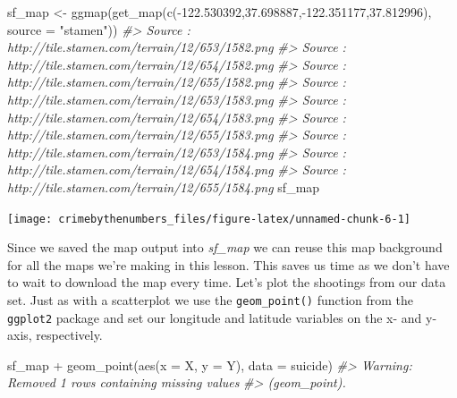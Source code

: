 \documentclass[
  12pt,
  openany]{book}
\newenvironment{Shaded}{\begin{snugshade}}{\end{snugshade}}
\newcommand{\AttributeTok}[1]{\textcolor[rgb]{0.61,0.61,0.61}{#1}}
\newcommand{\CommentTok}[1]{\textcolor[rgb]{0.37,0.37,0.37}{\textit{#1}}}
\newcommand{\FloatTok}[1]{\textcolor[rgb]{0.06,0.06,0.06}{#1}}
\newcommand{\FunctionTok}[1]{\textcolor[rgb]{0,0,0}{#1}}
\newcommand{\NormalTok}[1]{#1}
\newcommand{\OtherTok}[1]{\textcolor[rgb]{0.37,0.37,0.37}{#1}}
\newcommand{\SpecialCharTok}[1]{\textcolor[rgb]{0,0,0}{#1}}
\newcommand{\StringTok}[1]{\textcolor[rgb]{0.5,0.5,0.5}{#1}}
\begin{document}
\begin{Shaded}
\begin{Highlighting}[]
\NormalTok{sf\_map }\OtherTok{\textless{}{-}} \FunctionTok{ggmap}\NormalTok{(}\FunctionTok{get\_map}\NormalTok{(}\FunctionTok{c}\NormalTok{(}\SpecialCharTok{{-}}\FloatTok{122.530392}\NormalTok{,}\FloatTok{37.698887}\NormalTok{,}\SpecialCharTok{{-}}\FloatTok{122.351177}\NormalTok{,}\FloatTok{37.812996}\NormalTok{), }
                            \AttributeTok{source =} \StringTok{"stamen"}\NormalTok{))}
\CommentTok{\#\textgreater{} Source : http://tile.stamen.com/terrain/12/653/1582.png}
\CommentTok{\#\textgreater{} Source : http://tile.stamen.com/terrain/12/654/1582.png}
\CommentTok{\#\textgreater{} Source : http://tile.stamen.com/terrain/12/655/1582.png}
\CommentTok{\#\textgreater{} Source : http://tile.stamen.com/terrain/12/653/1583.png}
\CommentTok{\#\textgreater{} Source : http://tile.stamen.com/terrain/12/654/1583.png}
\CommentTok{\#\textgreater{} Source : http://tile.stamen.com/terrain/12/655/1583.png}
\CommentTok{\#\textgreater{} Source : http://tile.stamen.com/terrain/12/653/1584.png}
\CommentTok{\#\textgreater{} Source : http://tile.stamen.com/terrain/12/654/1584.png}
\CommentTok{\#\textgreater{} Source : http://tile.stamen.com/terrain/12/655/1584.png}
\NormalTok{sf\_map}
\end{Highlighting}
\end{Shaded}

\begin{center}\texttt{[image: crimebythenumbers\_files/figure-latex/unnamed-chunk-6-1]} \end{center}

Since we saved the map output into \emph{sf\_map} we can reuse this map background for all the maps we're making in this lesson. This saves us time as we don't have to wait to download the map every time. Let's plot the shootings from our data set. Just as with a scatterplot we use the \texttt{geom\_point()} function from the \texttt{ggplot2} package and set our longitude and latitude variables on the x- and y-axis, respectively.

\begin{Shaded}
\begin{Highlighting}[]
\NormalTok{sf\_map }\SpecialCharTok{+}
  \FunctionTok{geom\_point}\NormalTok{(}\FunctionTok{aes}\NormalTok{(}\AttributeTok{x =}\NormalTok{ X, }\AttributeTok{y =}\NormalTok{ Y),}
             \AttributeTok{data  =}\NormalTok{ suicide)}
\CommentTok{\#\textgreater{} Warning: Removed 1 rows containing missing values}
\CommentTok{\#\textgreater{} (geom\_point).}
\end{Highlighting}
\end{Shaded}
\end{document}
